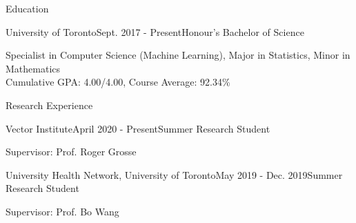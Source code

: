 \documentclass{resume} %
\begin{document}

\begin{rSection}{Education}
\begin{rSubsection}{University of Toronto}{Sept. 2017 - Present}{Honour's Bachelor of Science}{}
\item
Specialist in Computer Science (Machine Learning), Major in Statistics, Minor in Mathematics\\
Cumulative GPA: 4.00/4.00, Course Average: 92.34\%
\end{rSubsection}
\end{rSection}



\begin{rSection}{Research Experience}
\begin{rSubsection}{Vector Institute}{April 2020 - Present}{Summer Research Student}{}
\item
Supervisor: Prof. Roger Grosse
\end{rSubsection}
\begin{rSubsection}{University Health Network, University of Toronto}{May 2019 - Dec. 2019}{Summer Research Student}{}
\item
Supervisor: Prof. Bo Wang
\end{rSubsection}
\end{rSection}
\end{document}
